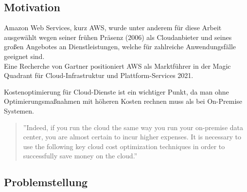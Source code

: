 \subsection{Motivation}
Amazon Web Services, kurz AWS, wurde unter anderem für diese Arbeit ausgewählt wegen seiner frühen Präsenz (2006) als Cloudanbieter und seines großen Angebotes an Dienstleistungen, welche für zahlreiche Anwendungsfälle geeignet sind.
\\
Eine Recherche von Gartner positioniert AWS als Marktführer in der Magic Quadrant für Cloud-Infrastruktur und Plattform-Services 2021.
{\cite{G01}}
\begin{comment} GELÖSCHT, WEIL DIESE EINE BEHAUPTUNG IST (25.10.2021)
\\\\
Für viele Unternehmen ist eine große Herausforderung, die Kosten von Cloud-Diensten übersichtlich zu halten und Optimierungsmöglichkeit leicht zu erkennen. Zusätzlich besteht die Gefahr, unangenehme Überraschungen in einer Rechnung zu bekommen, weil keine Grenze für den Konsum von Cloud-Diensten festgelegt wurde. 
\end{comment}
Kostenoptimierung für Cloud-Dienste ist ein wichtiger Punkt, da man ohne Optimierungsmaßnahmen mit höheren Kosten rechnen muss als bei On-Premise Systemen.
\\
\begin{quote}
    ”Indeed, if you run the cloud the same way you run your on-premise data center, you are almost certain to incur higher expenses. It is necessary to use the following key cloud cost optimization techniques in order to successfully save money on the cloud.”
{\cite{CCB}}
\end{quote}

\subsection{Problemstellung}

